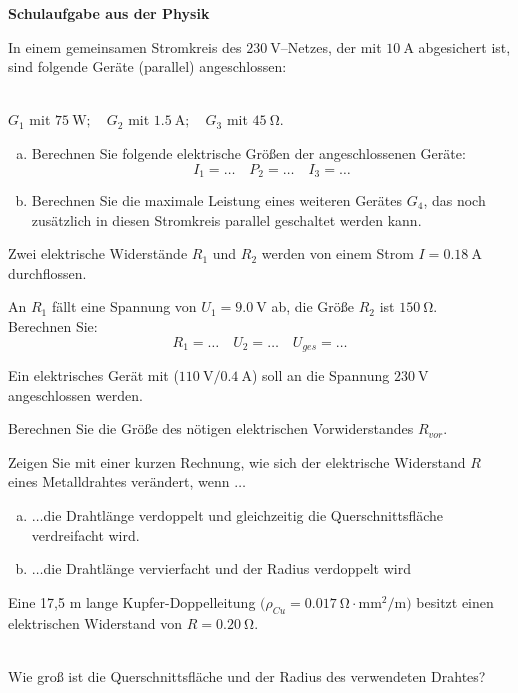 \documentclass[a4paper]{article}
\begin{document}
{\bf Schulaufgabe aus der Physik }\\
\begin{enumerate}[1.]

{\bf \item In einem gemeinsamen Stromkreis des $\SI{230}{\volt}$--Netzes, der mit $\SI{10}{\ampere}$ abgesichert ist, sind folgende Geräte (parallel) angeschlossen:}\\
 $G_1$ mit $ \SI{75}{\watt};\quad  G_2$ mit $\SI{1,5}{\ampere}; \quad G_3 $ mit $\SI{45}{\ohm}$.

\begin{enumerate}[a)]
\item Berechnen Sie folgende elektrische Größen der angeschlossenen Geräte:
$$ I_1=\dots \quad P_2=\dots \quad I_3=\dots$$
\item Berechnen Sie die maximale Leistung eines weiteren Gerätes $G_4$, das noch zusätzlich in diesen Stromkreis parallel geschaltet werden kann.
\end{enumerate}

{\bf \item Zwei elektrische Widerstände $R_1$ und $R_2$ werden von einem Strom $I = \SI{0,18}{\ampere}$ durchflossen.} An $R_1$ fällt eine Spannung von $U_1=\SI{9,0}{\volt}$ ab, die Größe $R_2$ ist 
$\SI{150}{\ohm}$.\\
 Berechnen Sie:
$$R_1=\dots \quad U_2=\dots \quad U_{ges}=\dots $$

{\bf \item Ein elektrisches Gerät mit ($\SI{110}{\volt} / \SI{0,4}{\ampere} $) soll an die Spannung $\SI{230}{\volt}$ ange\-schlossen werden.}  Berechnen Sie die Größe des nötigen elektrischen Vorwiderstandes $R_{vor}$.

{\bf \item Zeigen Sie mit einer kurzen Rechnung, wie sich der elektrische Widerstand $R$ eines Metalldrahtes verändert, wenn $\dots$}
\begin{enumerate}[a)]
\item $\dots$die Drahtlänge verdoppelt und gleichzeitig die Querschnittsfläche verdreifacht wird.
\item $\dots$die Drahtlänge vervierfacht und der Radius verdoppelt wird
\end{enumerate}

{\bf \item Eine 17,5 m lange Kupfer-Doppelleitung 
$\bigl( \rho_{Cu}= \SI{0,017}{\ohm\cdot\milli\meter^2 \per \meter}\bigr)$
besitzt einen elektrischen Widerstand von $R=\SI{0,20}{\ohm}$.}\\
Wie groß ist die Querschnittsfläche und der Radius des verwendeten Drahtes?


\end{enumerate}
\end{document}
